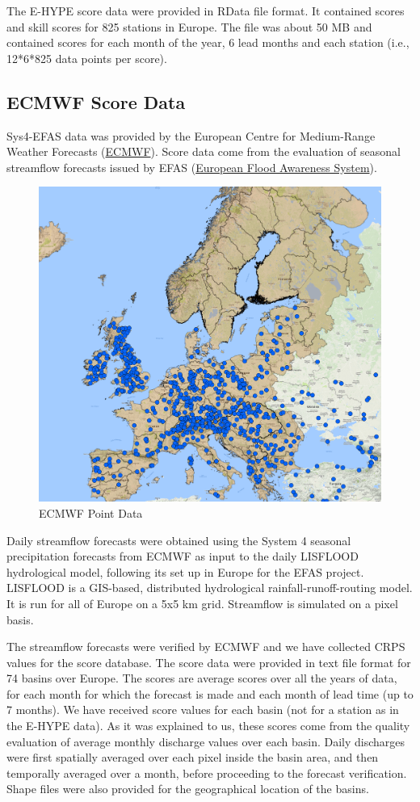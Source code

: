 \documentclass[logos,parttoc,morelanguage=french,morelanguage=german]{orsay-memoire}
\begin{document}
The E-HYPE score data were provided in RData file format. It contained scores and skill scores for 825 stations in Europe. The file was about 50 MB and contained scores for each month of the year, 6 lead months and each station (i.e., 12*6*825 data points per score).

\subsection{ECMWF Score Data}

\gls{Sys4-EFAS} data was provided by the European Centre for Medium-Range Weather Forecasts (\href{http://www.ecmwf.int}{ECMWF}). Score data come from the evaluation of seasonal streamflow forecasts issued by EFAS (\href{https://www.efas.eu/about-efas.html}{European Flood Awareness System}).

\begin{figure}[H]
\centering
\includegraphics[width=0.8\linewidth]{images/gisEFASpoints.png}
  \caption{ECMWF Point Data}
  \label{fig:ECMWFdata}
\end{figure}

Daily streamflow forecasts were obtained using the System 4 seasonal precipitation forecasts from ECMWF as input to the daily LISFLOOD hydrological model, following its set up in Europe for the EFAS project. LISFLOOD is a GIS-based, distributed hydrological rainfall-runoff-routing model. It is run for all of Europe on a 5x5 km grid. Streamflow is simulated on a pixel basis.

The streamflow forecasts were verified by ECMWF and we have collected CRPS values for the score database. The score data were provided in text file format for 74 basins over Europe. The scores are average scores over all the years of data, for each month for which the forecast is made and each month of lead time (up to 7 months). We have received score values for each basin (not for a station as in the E-HYPE data).  As it was explained to us, these scores come from the quality evaluation of average monthly discharge values over each basin. Daily discharges were first spatially averaged over each pixel inside the basin area, and then temporally averaged over a month, before proceeding to the forecast verification. Shape files were also provided for the geographical location of the basins.
\end{document}
